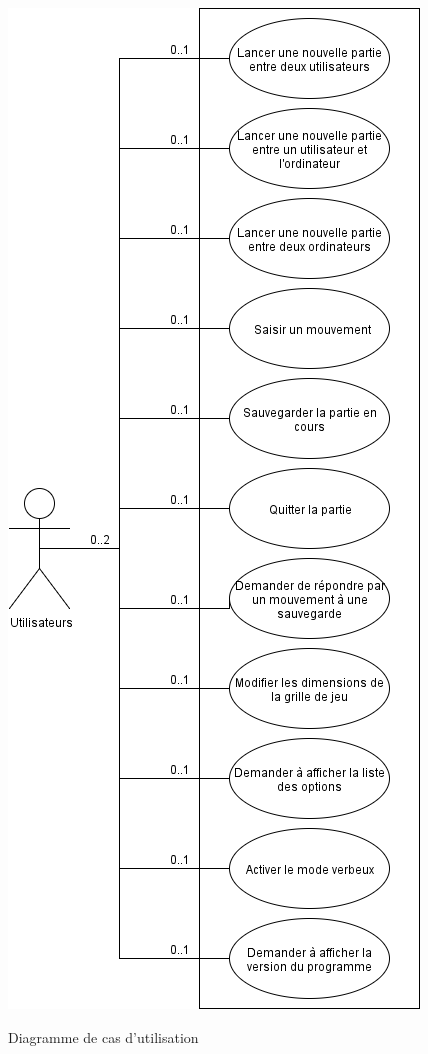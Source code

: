 \documentclass[10pt,a4paper]{article}
\begin{document}
\begin{figure}[H]
\centering
\includegraphics[scale=0.5]{images/use_case.png}
\label{use_case}
\caption{Diagramme de cas d'utilisation}
\end{figure}
\end{document}
